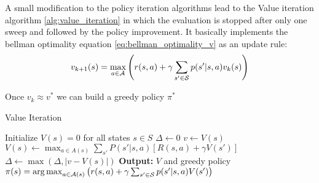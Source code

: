 A small modification to the policy iteration algorithms lead to the Value iteration algorithm \ref{alg:value_iteration} in which the evaluation is stopped after only one sweep
and followed by the policy improvement. It basically implements the bellman optimality equation \eqref{eq:bellman_optimality_v} as an update rule:
\begin{equation*}
    v_{k+1}(s) = \max_{a \in \mathcal{A}}\left(r(s,a) + \gamma\sum_{s' \in \mathcal{S}}p(s'|s,a)v_k(s)\right)
\end{equation*}

Once $v_k \approx v^*$ we can build a greedy policy $\pi^*$

\begin{algorithm}[H]
    \caption{Value Iteration}\label{alg:value_iteration}
    \begin{algorithmic}[1]
    \STATE Initialize $V(s) = 0$ for all states $s \in S$
    \REPEAT
        \STATE $\Delta \gets 0$
            \STATE $v \gets V(s)$
            \STATE $V(s) \gets \max_{a \in A(s)} \sum_{s'} P(s'|s,a) \left[ R(s,a) + \gamma V(s') \right]$
            \STATE $\Delta \gets \max(\Delta, |v - V(s)|)$
        \ENDFOR
    \UNTIL{$\Delta < \theta$}
    \STATE \textbf{Output:} $V$ and greedy policy $\pi(s) = \operatorname*{arg\,max}_{a \in \mathcal{A}(s)}\left(r(s,a) + \gamma\sum_{s' \in \mathcal{S}}p(s'|s,a)V(s')\right)$
    \end{algorithmic}
    \end{algorithm}
